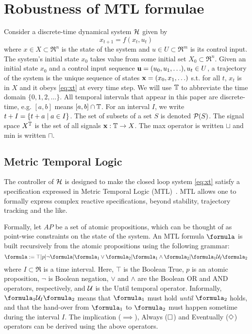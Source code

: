 \section{Robustness of MTL formulae}
\label{sec:robust semantics}

Consider a discrete-time dynamical system $\mathcal{H}$ given by 
\begin{equation}
\label{eq:xt}
x_{t+1} = f(x_t,u_t)
\end{equation}
where $x \in X \subset \Re^n$ is the state of the system and $u \in U \subset \Re^m$ is its control input.
The system's initial state $x_0$ takes value from some initial set $X_0 \subset \Re^n$.
Given an initial state $x_0$ and a control input sequence $\mathbf{u} = (u_0,u_1,\ldots), u_t \in U$, a trajectory of the system is the unique sequence of states $\mathbf{x} = (x_0,x_1,\ldots)$ s.t. for all $t$, $x_t$ is in $X$ and it obeys \eqref{eq:xt} at every time step.
We will use $\mathbb{T}$ to abbreviate the time domain $\{0,1,2,\ldots\}$.
All temporal intervals that appear in this paper are discrete-time, e.g. $[a,b]$ means $[a,b] \cap \mathbb{T}$. 
For an interval $I$, we write $t+I = \{t+a \;|\; a \in I\}$.
The set of subsets of a set $S$ is denoted $\mathcal{P}(S)$.
The signal space $X^{\mathbb{T}}$ is the set of all signals $\mathbf{x}: \mathbb{T} \rightarrow X$.
The max operator is written $\sqcup$ and min is written $\sqcap$.

\subsection{Metric Temporal Logic}
\label{sec:mtl}
The controller of $\mathcal{H}$ is designed to make the closed loop system \eqref{eq:xt} satisfy a specification expressed in Metric Temporal Logic (MTL)~\cite{Ouaknine08_RecentResultsMTL}.
MTL allows one to formally express complex reactive specifications, beyond stability, trajectory tracking and the like.

Formally, let $AP$ be a set of atomic propositions, which can be thought of as point-wise constraints on the state of the system.
An MTL formula $\formula$ is built recursively from the atomic propositions using the following grammar:
\[\formula \defeq \top|p|\neg \formula | \formula_1 \lor \formula_2 | \formula_1 \land \formula_2 | \formula_1 \until_I \formula_2\]
where $I \subset \Re$ is a time interval.
Here, $\top$ is the Boolean True, $p$ is an atomic proposition, $\neg$ is Boolean negation, $\lor$ and $\land$ are the Boolean OR and AND operators, respectively, and $\mathcal{U}$ is the Until temporal operator.
Informally, $\formula_1 \until_I \formula_2$ means that $\formula_1$ must hold \textit{until} $\formula_2$ holds, and that the hand-over from $\formula_1$  to $\formula_2$ must happen sometime during the interval $I$.
The implication ($\implies$), Always ($\square$) and Eventually ($\Diamond$) operators can be derived using the above operators.

